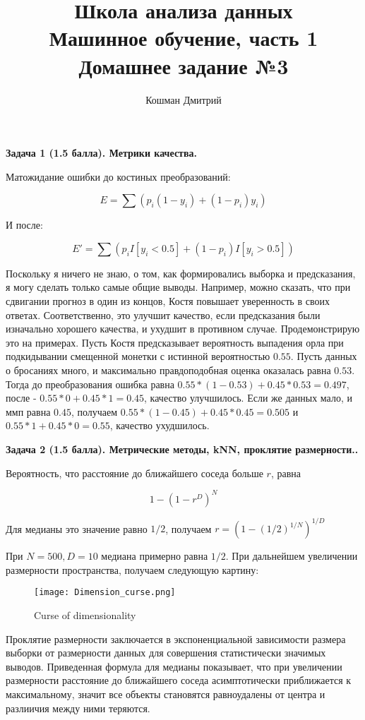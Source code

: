 \documentclass[a4paper]{article}
\title{Школа анализа данных\\ Машинное обучение, часть 1 \\ Домашнее задание №3}
\author{Кошман Дмитрий}
\date{}
\begin{document}
\maketitle

\textbf{Задача 1 (1.5 балла). Метрики качества.}

    Матожидание ошибки до костиных преобразований:
    
    $$ E = \sum ( p_i (1-y_i) + (1-p_i)y_i) $$
    
    И после:
    
    $$ E' = \sum (p_i I [ y_i < 0.5 ] + (1-p_i) I [ y_i > 0.5 ])$$
    
    Поскольку я ничего не знаю, о том, как формировались выборка и предсказания, я могу сделать только самые общие выводы. Например, можно сказать, что при сдвигании прогноз в один из концов, Костя повышает уверенность в своих ответах. Соответственно, это улучшит качество, если предсказания были изначально хорошего качества, и ухудшит в противном случае. Продемонстрирую это на примерах. Пусть Костя предсказывает вероятность выпадения орла при подкидывании смещенной монетки с истинной вероятностью $0.55$. Пусть данных о бросаниях много, и максимально правдоподобная оценка оказалась равна $0.53$. Тогда до преобразования ошибка равна $ 0.55*(1-0.53) + 0.45*0.53  = 0.497$, после - $ 0.55 * 0 + 0.45*1 = 0.45 $, качество улучшилось. Если же данных мало, и ммп равна $0.45$, получаем $0.55 * (1- 0.45) + 0.45*0.45 = 0.505$ и $ 0.55 * 1 + 0.45 * 0 = 0.55 $, качество ухудшилось.
    
    

\bigskip

\textbf{Задача 2 (1.5 балла). Метрические методы, kNN, проклятие размерности..}

Вероятность, что расстояние до ближайшего соседа больше $r$, равна

$$ 1 - (1 - r^D) ^N$$

Для медианы это значение равно $1/2$, получаем $r = (1 - (1/2)^{1/N})^{1/D}$

При $N = 500, D=10$ медиана примерно равна $1/2$. При дальнейшем увеличении размерности пространства, получаем следующую картину:

\begin{figure}[h!]
	\texttt{[image: Dimension\_curse.png]}
	\caption{Curse of dimensionality}
	\label{fig:boat1}
\end{figure}

Проклятие размерности заключается в экспоненциальной зависимости размера выборки от размерности данных для совершения статистически значимых выводов. Приведенная формула для медианы показывает, что при увеличении размерности расстояние до ближайшего соседа асимптотически приближается к максимальному, значит все объекты становятся равноудалены от центра и разлиичия между ними теряются.
\end{document}
